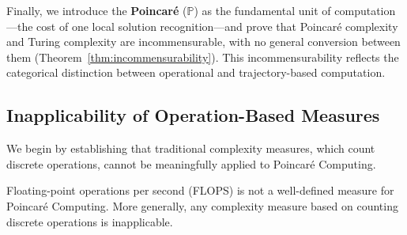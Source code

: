 Finally, we introduce the \textbf{Poincaré} ($\mathbb{P}$) as the fundamental unit of computation—the cost of one local solution recognition—and prove that Poincaré complexity and Turing complexity are incommensurable, with no general conversion between them (Theorem~\ref{thm:incommensurability}). This incommensurability reflects the categorical distinction between operational and trajectory-based computation.

\subsection{Inapplicability of Operation-Based Measures}

We begin by establishing that traditional complexity measures, which count discrete operations, cannot be meaningfully applied to Poincaré Computing.

\begin{proposition}
\label{prop:flops_inapplicable}
Floating-point operations per second (FLOPS) is not a well-defined measure for Poincaré Computing. More generally, any complexity measure based on counting discrete operations is inapplicable.
\end{proposition}

